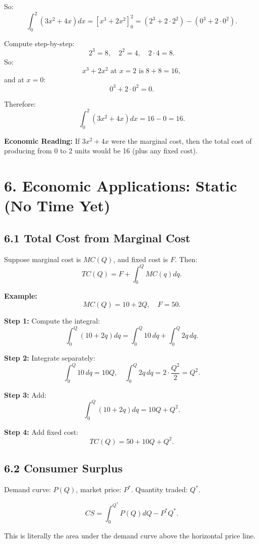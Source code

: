 \documentclass[12pt]{article}
\begin{document}
So:
\[
\int_0^2 (3x^2 + 4x)dx = [x^3 + 2x^2]_0^2 = (2^3 + 2\cdot 2^2) - (0^3 + 2\cdot 0^2).
\]

Compute step-by-step:
\[
2^3 = 8, \quad 2^2 = 4, \quad 2\cdot 4 = 8.
\]
So:
\[
x^3 + 2x^2 \text{ at } x=2 \text{ is } 8 + 8 = 16,
\]
and at $x=0$:
\[
0^3 + 2\cdot 0^2 = 0.
\]

Therefore:
\[
\int_0^2 (3x^2 + 4x)dx = 16 - 0 = 16.
\]

\begin{tcolorbox}
\textbf{Economic Reading:} If $3x^2+4x$ were the marginal cost, then the total cost of producing from 0 to 2 units would be 16 (plus any fixed cost).
\end{tcolorbox}

\section*{6. Economic Applications: Static (No Time Yet)}

\subsection*{6.1 Total Cost from Marginal Cost}

Suppose marginal cost is $MC(Q)$, and fixed cost is $F$. Then:
\[
TC(Q) = F + \int_0^Q MC(q)dq.
\]

\textbf{Example:}
\[
MC(Q) = 10 + 2Q, \quad F=50.
\]

\textbf{Step 1:} Compute the integral:
\[
\int_0^Q (10+2q)dq = \int_0^Q 10\,dq + \int_0^Q 2q\,dq.
\]

\textbf{Step 2:} Integrate separately:
\[
\int_0^Q 10\,dq = 10Q, \quad
\int_0^Q 2q\,dq = 2\cdot \frac{Q^2}{2} = Q^2.
\]

\textbf{Step 3:} Add:
\[
\int_0^Q (10+2q)dq = 10Q + Q^2.
\]

\textbf{Step 4:} Add fixed cost:
\[
TC(Q) = 50 + 10Q + Q^2.
\]

\subsection*{6.2 Consumer Surplus}

Demand curve: $P(Q)$, market price: $P^*$. Quantity traded: $Q^*$.

\[
CS = \int_0^{Q^*} P(Q)dQ - P^* Q^*.
\]

This is literally the area under the demand curve above the horizontal price line.
\newpage
\end{document}
